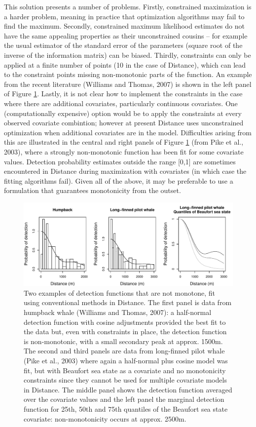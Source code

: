 \documentclass[useAMS,referee]{biom}
\begin{document}
This solution presents a number of problems. Firstly, constrained maximization is a harder problem, meaning in practice that optimization algorithms may fail to find the maximum.  Secondly, constrained maximum likelihood estimates do not have the same appealing properties as their unconstrained cousins -- for example the usual estimator of the standard error of the parameters (square root of the inverse of the information matrix) can be biased.  Thirdly, constraints can only be applied at a finite number of points (10 in the case of Distance), which can lead to the constraint points missing non-monotonic parts of the function.  An example from the recent literature (Williams and Thomas, 2007) is shown in the left panel of Figure \ref{fig1}.  Lastly, it is not clear how to implement the constraints in the case where there are additional covariates, particularly continuous covariates.  One (computationally expensive) option would be to apply the constraints at every observed covariate combintion; however at present Distance uses unconstrained optimization when additional covariates are in the model.  Difficulties arising from this are illustrated in the central and right panels of Figure \ref{fig1} (from Pike et al., 2003), where a strongly non-monotonic function has been fit for some covariate values.  Detection probability estimates outside the range [0,1] are sometimes encountered in Distance during maximization with covariates (in which case the fitting algorithms fail).  Given all of the above, it may be preferable to use a formulation that guarantees monotonicity from the outset.

\begin{figure}
\centering
\includegraphics[width=\textwidth]{figs/figure1.pdf}
\caption{Two examples of detection functions that are not monotone, fit using conventional methods in Distance. The first panel is data from humpback whale (Williams and Thomas, 2007): a half-normal detection function with cosine adjustments provided the best fit to the data but, even with constraints in place, the detection function is non-monotonic, with a small secondary peak at approx. 1500m. The second and third panels are data from long-finned pilot whale (Pike et al., 2003) where again a half-normal plus cosine model was fit, but with Beaufort sea state as a covariate and no monotonicity constraints since they cannot be used for multiple covariate models in Distance.  The middle panel shows the detection function averaged over the covariate values and the left panel the marginal detection function for 25th, 50th and 75th quantiles of the Beaufort sea state covariate: non-monotonicity occurs at approx. 2500m.}
\label{fig1}
\end{figure}
\end{document}
